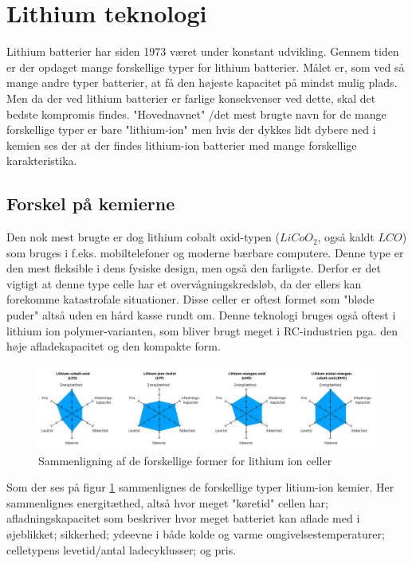 \section{Lithium teknologi}
Lithium batterier har siden 1973 været under konstant udvikling. Gennem tiden er der opdaget mange forskellige typer for lithium batterier. Målet er, som ved så mange andre typer batterier, at få den højeste kapacitet på mindst mulig plads. Men da der ved lithium batterier er farlige konsekvenser ved dette, skal det bedste kompromis findes. "Hovednavnet" \space /det mest brugte navn for de mange forskellige typer er bare "lithium-ion" \space men hvis der dykkes lidt dybere ned i kemien ses der at der findes lithium-ion batterier med mange forskellige karakteristika. 

\subsection{Forskel på kemierne}
Den nok mest brugte er dog lithium cobalt oxid-typen ($LiCoO_2$, også kaldt $LCO$) som bruges i f.eks. mobiltelefoner og moderne bærbare computere. Denne type er den mest fleksible i dens fysiske design, men også den farligste. Derfor er det vigtigt at denne type celle har et overvågningskredsløb, da der ellers kan forekomme katastrofale situationer. Disse celler er oftest formet som "bløde puder" \space \textemdash \space altså uden en hård kasse rundt om. Denne teknologi bruges også oftest i lithium ion polymer-varianten, som bliver brugt meget i RC-industrien pga. den høje afladekapacitet og den kompakte form.

\begin{figure}[h]
	\centering
	\includegraphics[width=15cm]{billeder/chemical-comparison.png}
	\caption{Sammenligning af de forskellige former for lithium ion celler\protect\footnotemark}
	\label{fig:lithium_variants_comparison}
\end{figure}

Som der ses på figur \ref{fig:lithium_variants_comparison} sammenlignes de forskellige typer litium-ion kemier. Her sammenlignes energitæthed, altså hvor meget "køretid" \space cellen har; afladningskapacitet som beskriver hvor meget batteriet kan aflade med i øjeblikket; sikkerhed; ydeevne i både kolde og varme omgivelsestemperaturer; celletypens levetid/antal ladecyklusser; og pris. \\

